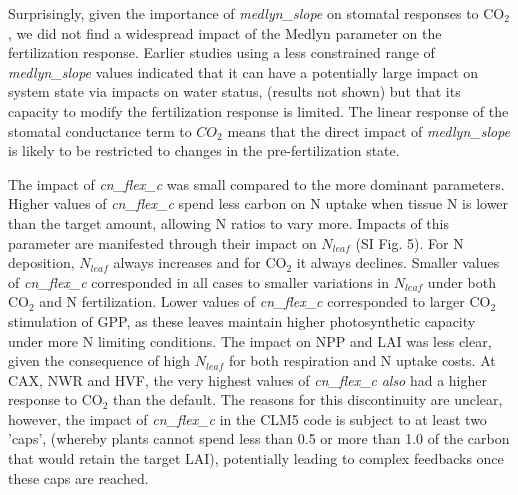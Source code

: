 \documentclass[draft,linenumbers]{agujournal}
\begin{document}
Surprisingly, given the importance of \emph{medlyn\_slope} on stomatal responses to CO$_{2}$, we did not find a widespread impact of the Medlyn parameter on the fertilization response. Earlier studies using a less constrained range of \emph{medlyn\_slope} values indicated that it can have a potentially large impact on system state via impacts on water status, (results not shown) but that its capacity to modify the fertilization response is limited. The linear response of the stomatal conductance term to $CO_{2}$ means that the direct impact of \emph{medlyn\_slope} is likely to be restricted to changes in the pre-fertilization state. 

The impact of \emph{cn\_flex\_c} was small compared to the more dominant parameters. Higher values of \emph{cn\_flex\_c} spend less carbon on N uptake when tissue N is lower than the target amount, allowing N ratios to vary more. Impacts of this parameter are manifested through their impact on $N_{leaf}$ (SI Fig. 5). For N deposition, $N_{leaf}$ always increases and for CO$_{2}$ it always declines. Smaller values of \emph{cn\_flex\_c} corresponded in all cases to smaller variations in $N_{leaf}$ under both CO$_{2}$ and N fertilization.  Lower values of \emph{cn\_flex\_c} corresponded to larger CO$_{2}$ stimulation of GPP, as these leaves maintain higher photosynthetic capacity under more N limiting conditions. The impact on NPP and LAI was less clear, given the consequence of high $N_{leaf}$ for both respiration and N uptake costs. At CAX, NWR and HVF,  the very highest values of \emph{cn\_flex\_c} \emph{also} had a higher response to CO$_{2}$ than the default. The reasons for this discontinuity are unclear, however, the impact of \emph{cn\_flex\_c} in the CLM5 code is subject to at least two 'caps', (whereby plants cannot spend less than 0.5 or more than 1.0 of the carbon that would retain the target LAI), potentially leading to complex feedbacks once these caps are reached.  
\end{document}
